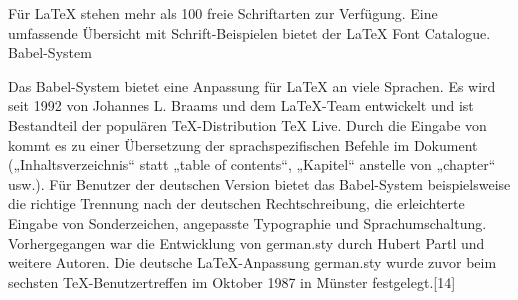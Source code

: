 Für LaTeX stehen mehr als 100 freie Schriftarten zur Verfügung. Eine umfassende Übersicht mit Schrift-Beispielen bietet der LaTeX Font Catalogue.
Babel-System

Das Babel-System bietet eine Anpassung für LaTeX an viele Sprachen. Es wird seit 1992 von Johannes L. Braams und dem LaTeX-Team entwickelt und ist Bestandteil der populären TeX-Distribution TeX Live. Durch die Eingabe von  kommt es zu einer Übersetzung der sprachspezifischen Befehle im Dokument („Inhaltsverzeichnis“ statt „table of contents“, „Kapitel“ anstelle von „chapter“ usw.). Für Benutzer der deutschen Version bietet das Babel-System beispielsweise die richtige Trennung nach der deutschen Rechtschreibung, die erleichterte Eingabe von Sonderzeichen, angepasste Typographie und Sprachumschaltung. Vorhergegangen war die Entwicklung von german.sty durch Hubert Partl und weitere Autoren.\cite{Babel}\cite{Kopka} Die deutsche LaTeX-Anpassung german.sty wurde zuvor beim sechsten TeX-Benutzertreffen im Oktober 1987 in Münster festgelegt.[14]